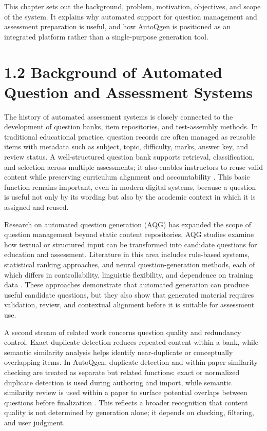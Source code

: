 This chapter sets out the background, problem, motivation, objectives, and scope of the system. It explains why automated support for question management and assessment preparation is useful, and how AutoQgen is positioned as an integrated platform rather than a single-purpose generation tool.

\section{1.2 Background of Automated Question and Assessment Systems}

The history of automated assessment systems is closely connected to the development of question banks, item repositories, and test-assembly methods. In traditional educational practice, question records are often managed as reusable items with metadata such as subject, topic, difficulty, marks, answer key, and review status. A well-structured question bank supports retrieval, classification, and selection across multiple assessments; it also enables instructors to reuse valid content while preserving curriculum alignment and accountability \cite{moodleQuestionBank,moodleQuestionCategories,imsQti3}. This basic function remains important, even in modern digital systems, because a question is useful not only by its wording but also by the academic context in which it is assigned and reused.

Research on automated question generation (AQG) has expanded the scope of question management beyond static content repositories. AQG studies examine how textual or structured input can be transformed into candidate questions for education and assessment. Literature in this area includes rule-based systems, statistical ranking approaches, and neural question-generation methods, each of which differs in controllability, linguistic flexibility, and dependence on training data \cite{mitkovHa2003,hoshinoNakagawa2005,heilmanSmith2010,du2017,kurdi2020}. These approaches demonstrate that automated generation can produce useful candidate questions, but they also show that generated material requires validation, review, and contextual alignment before it is suitable for assessment use.

A second stream of related work concerns question quality and redundancy control. Exact duplicate detection reduces repeated content within a bank, while semantic similarity analysis helps identify near-duplicate or conceptually overlapping items. In AutoQgen, duplicate detection and within-paper similarity checking are treated as separate but related functions: exact or normalized duplicate detection is used during authoring and import, while semantic similarity review is used within a paper to surface potential overlaps between questions before finalization \cite{reimers2019sbert,agirre2012sts}. This reflects a broader recognition that content quality is not determined by generation alone; it depends on checking, filtering, and user judgment.

